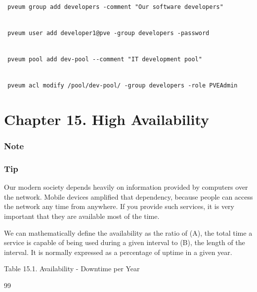 \begin{lstlisting}

 pveum group add developers -comment "Our software developers"

\end{lstlisting}

\begin{lstlisting}

 pveum user add developer1@pve -group developers -password

\end{lstlisting}

\begin{lstlisting}

 pveum pool add dev-pool --comment "IT development pool"

\end{lstlisting}

\begin{lstlisting}

 pveum acl modify /pool/dev-pool/ -group developers -role PVEAdmin

\end{lstlisting}


\section{Chapter 15. High Availability}

\subsubsection{Note}

\subsubsection{Tip}

Our modern society depends heavily on information provided by computers over the network. Mobile devices amplified that dependency, because people can access the network any time from anywhere. If you provide such services, it is very important that they are available most of the time.

We can mathematically define the availability as the ratio of (A), the total time a service is capable of being used during a given interval to (B), the length of the interval. It is normally expressed as a percentage of uptime in a given year.

Table 15.1. Availability - Downtime per Year

99

